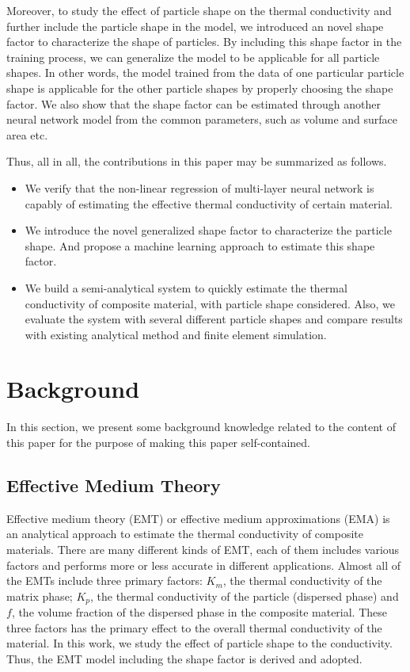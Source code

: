 \documentclass[conference,compsoc]{IEEEtran}
\begin{document}
Moreover, to study the effect of particle shape on the thermal conductivity and further include the particle shape in the model, we introduced an novel shape factor to characterize the shape of particles. By including this shape factor in the training process, we can generalize the model to be applicable for all particle shapes. In other words, the model trained from the data of one particular particle shape is applicable for the other particle shapes by properly choosing the shape factor. We also show that the shape factor can be estimated through another neural network model from the common parameters, such as volume and surface area etc. 

Thus, all in all, the contributions in this paper may be summarized as follows.
\begin{itemize}
\item We verify that the non-linear regression of multi-layer neural network is capably of estimating the effective thermal conductivity of certain material.
\item We introduce the novel generalized shape factor to characterize the particle shape. And propose a machine learning approach to estimate this shape factor.
\item We build a semi-analytical system to quickly estimate the thermal conductivity of composite material, with particle shape considered. Also, we evaluate the system with several different particle shapes and compare results with existing analytical method and finite element simulation.
\end{itemize}

\section{Background}
In this section, we present some background knowledge related to the content of this paper for the purpose of making this paper self-contained.
\subsection{Effective Medium Theory}
\label{sectionEMT}
Effective medium theory (EMT) or effective medium approximations (EMA) is an analytical approach to estimate the thermal conductivity of composite materials. There are many different kinds of EMT, each of them includes various factors and performs more or less accurate in different applications. Almost all of the EMTs include three primary factors: $K_m$, the thermal conductivity of the matrix phase; $K_p$, the thermal conductivity of the particle (dispersed phase) and $f$, the volume fraction of the dispersed phase in the composite material. These three factors has the primary effect to the overall thermal conductivity of the material. In this work, we study the effect of particle shape to the conductivity. Thus, the EMT model including the shape factor is derived and adopted. 
  
\end{document}
